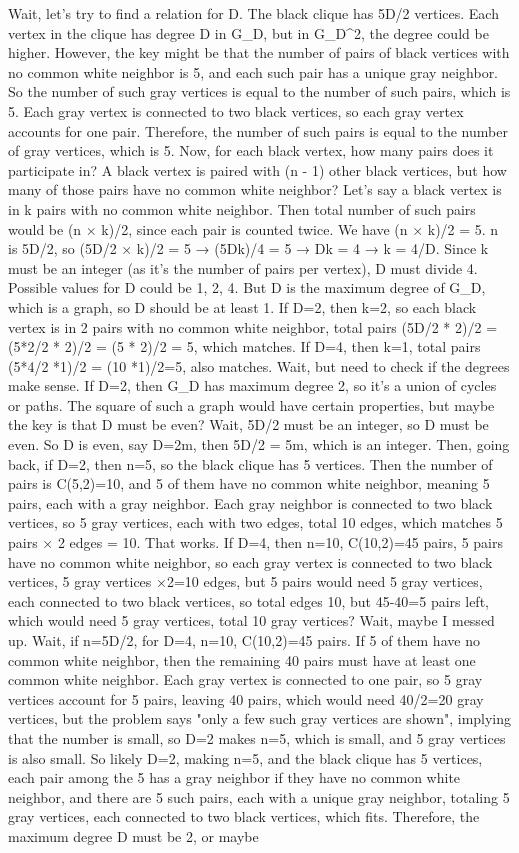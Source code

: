 Wait, let's try to find a relation for D. The black clique has 5D/2 vertices. Each vertex in the clique has degree D in G_D, but in G_D^2, the degree could be higher. However, the key might be that the number of pairs of black vertices with no common white neighbor is 5, and each such pair has a unique gray neighbor. So the number of such gray vertices is equal to the number of such pairs, which is 5. Each gray vertex is connected to two black vertices, so each gray vertex accounts for one pair. Therefore, the number of such pairs is equal to the number of gray vertices, which is 5. Now, for each black vertex, how many pairs does it participate in? A black vertex is paired with (n - 1) other black vertices, but how many of those pairs have no common white neighbor? Let's say a black vertex is in k pairs with no common white neighbor. Then total number of such pairs would be (n × k)/2, since each pair is counted twice. We have (n × k)/2 = 5. n is 5D/2, so (5D/2 × k)/2 = 5 → (5Dk)/4 = 5 → Dk = 4 → k = 4/D. Since k must be an integer (as it's the number of pairs per vertex), D must divide 4. Possible values for D could be 1, 2, 4. But D is the maximum degree of G_D, which is a graph, so D should be at least 1. If D=2, then k=2, so each black vertex is in 2 pairs with no common white neighbor, total pairs (5D/2 * 2)/2 = (5*2/2 * 2)/2 = (5 * 2)/2 = 5, which matches. If D=4, then k=1, total pairs (5*4/2 *1)/2 = (10 *1)/2=5, also matches. Wait, but need to check if the degrees make sense. If D=2, then G_D has maximum degree 2, so it's a union of cycles or paths. The square of such a graph would have certain properties, but maybe the key is that D must be even? Wait, 5D/2 must be an integer, so D must be even. So D is even, say D=2m, then 5D/2 = 5m, which is an integer. Then, going back, if D=2, then n=5, so the black clique has 5 vertices. Then the number of pairs is C(5,2)=10, and 5 of them have no common white neighbor, meaning 5 pairs, each with a gray neighbor. Each gray neighbor is connected to two black vertices, so 5 gray vertices, each with two edges, total 10 edges, which matches 5 pairs × 2 edges = 10. That works. If D=4, then n=10, C(10,2)=45 pairs, 5 pairs have no common white neighbor, so each gray vertex is connected to two black vertices, 5 gray vertices ×2=10 edges, but 5 pairs would need 5 gray vertices, each connected to two black vertices, so total edges 10, but 45-40=5 pairs left, which would need 5 gray vertices, total 10 gray vertices? Wait, maybe I messed up. Wait, if n=5D/2, for D=4, n=10, C(10,2)=45 pairs. If 5 of them have no common white neighbor, then the remaining 40 pairs must have at least one common white neighbor. Each gray vertex is connected to one pair, so 5 gray vertices account for 5 pairs, leaving 40 pairs, which would need 40/2=20 gray vertices, but the problem says "only a few such gray vertices are shown", implying that the number is small, so D=2 makes n=5, which is small, and 5 gray vertices is also small. So likely D=2, making n=5, and the black clique has 5 vertices, each pair among the 5 has a gray neighbor if they have no common white neighbor, and there are 5 such pairs, each with a unique gray neighbor, totaling 5 gray vertices, each connected to two black vertices, which fits. Therefore, the maximum degree D must be 2, or maybe 